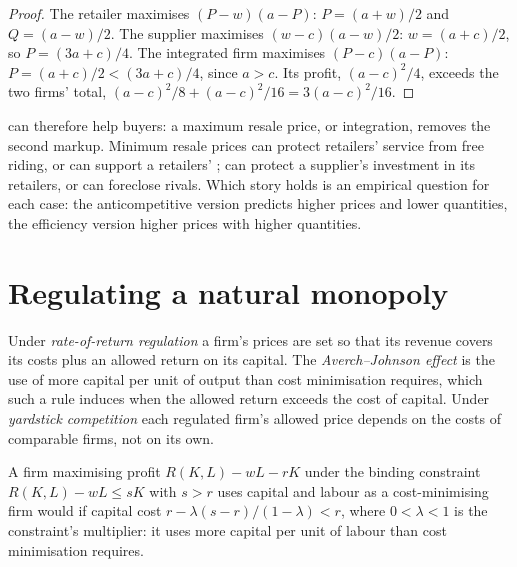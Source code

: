 \begin{proof}
The retailer maximises $(P - w)(a - P)$: $P = (a + w)/2$ and $Q = (a - w)/2$. The supplier maximises $(w - c)(a - w)/2$: $w = (a + c)/2$, so
$P = (3a + c)/4$. The integrated firm maximises $(P - c)(a - P)$: $P = (a + c)/2 < (3a + c)/4$, since $a > c$. Its profit, $(a - c)^2/4$, exceeds the two
firms' total, $(a - c)^2/8 + (a - c)^2/16 = 3(a - c)^2/16$.
\end{proof}

 can therefore help buyers: a maximum resale price, or
integration, removes the second markup. Minimum resale prices can protect
retailers' service from free riding, or can support a retailers' ;  can protect a supplier's investment in its retailers, or can foreclose
rivals. Which story holds is an empirical question for each case: the
anticompetitive version predicts higher prices and lower quantities, the efficiency
version higher prices with higher quantities.

\section{Regulating a natural monopoly}\label{sec:b3:competition-policy:regulation}

\begin{definition}\label{def:b3:competition-policy:regulation}
Under \emph{rate-of-return regulation} a firm's prices are set so that its revenue
covers its costs plus an allowed return on its capital. The \emph{Averch--Johnson
effect} is the use of more capital per unit of output than cost minimisation
requires, which such a rule induces when the allowed return exceeds the cost of
capital. Under \emph{yardstick competition} each regulated firm's allowed price
depends on the costs of comparable firms, not on its own.
\end{definition}

\begin{proposition}\label{prop:b3:competition-policy:aj}
A firm maximising profit $R(K, L) - wL - rK$ under the binding constraint $R(K, L) - wL \le sK$ with $s > r$ uses capital and
labour as a cost-minimising firm would if capital cost $r - \lambda(s - r)/(1 - \lambda) < r$, where $0 < \lambda < 1$ is the
constraint's multiplier: it uses more capital per unit of labour than cost
minimisation requires.
\end{proposition}

